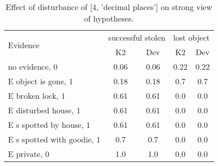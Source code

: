 \begin{table}\begin{tabular}{l|cc|cc}\toprule\multirow{2}{*}{Evidence} & \multicolumn{2}{c}{successful stolen}& \multicolumn{2}{c}{lost object}\\& {K2} & {Dev}& {K2} & {Dev}\\\midrule
no evidence, 0 & 0.06&0.06&0.22&0.22\\E object is gone, 1 & 0.18&0.18&0.7&0.7\\E broken lock, 1 & 0.61&0.61&0.0&0.0\\E disturbed house, 1 & 0.61&0.61&0.0&0.0\\E s spotted by house, 1 & 0.61&0.61&0.0&0.0\\E s spotted with goodie, 1 & 0.7&0.7&0.0&0.0\\E private, 0 & 1.0&1.0&0.0&0.0\\\bottomrule\end{tabular}\caption{Effect of disturbance of [4, 'decimal places'] on strong view of hypotheses.}\end{table}